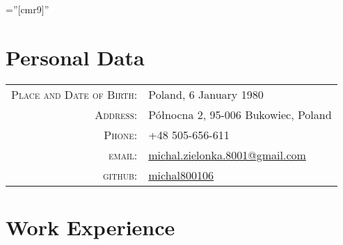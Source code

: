 \documentclass[a4paper,9pt]{article} %
\begin{document}
\pagestyle{empty} %

\font\fb=''[cmr9]'' %


\par{\bigskip\par} %

\section{Personal Data}

\begin{tabular}{rl}
\textsc{Place and Date of Birth:} & Poland, 6 January 1980 \\
\textsc{Address:} & Północna 2, 95-006 Bukowiec, Poland \\
\textsc{Phone:} & +48 505-656-611 \\
\textsc{email:} & \href{mailto:michal.zielonka.8001@gmail.com}{michal.zielonka.8001@gmail.com} \\
\textsc{github:} & \href{https://github.com/michal800106}{michal800106}
\end{tabular}


\section{Work Experience}
\end{document}
